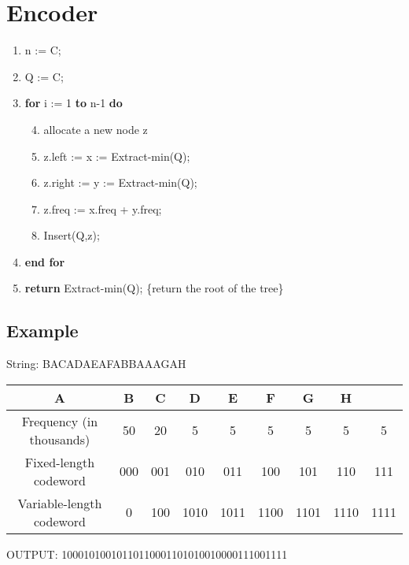 \section{Encoder}
\begin{enumerate}
\tightlist
\item
  n := \textbar{}C\textbar{};
\item
  Q := C;
\item
  \textbf{for} i := 1 \textbf{to} n-1 \textbf{do}
  \begin{enumerate}
  \setcounter{enumii}{3}
  \tightlist
  \item
    allocate a new node z
  \item
    z.left := x := Extract-min(Q);
  \item
    z.right := y := Extract-min(Q);
  \item
    z.freq := x.freq + y.freq;
  \item
    Insert(Q,z);
  \end{enumerate}
\item
  \textbf{end for}
\item
  \textbf{return} Extract-min(Q); \{return the root of the tree\}
\end{enumerate}

\subsection{Example}

String: BACADAEAFABBAAAGAH

\begin{tabular}{ccccccccc}
  A & B & C & D & E & F & G & H\\
  \hline
 Frequency (in thousands) & 50 & 20 & 5 & 5 & 5 & 5 & 5 & 5 \\
 Fixed-length codeword & 000 & 001 & 010 & 011 & 100 & 101 & 110 & 111 \\
 Variable-length codeword & 0 & 100 & 1010 & 1011 & 1100 & 1101 & 1110 & 1111
\end{tabular}


OUTPUT: 10001010010110110001101010010000111001111

